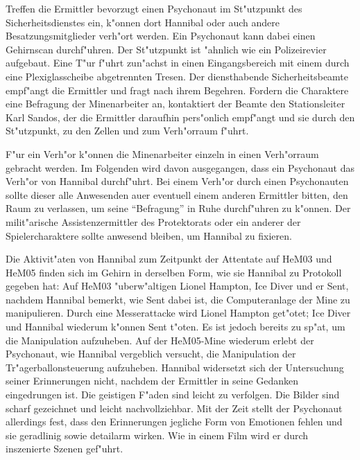 
Treffen die Ermittler bevorzugt einen Psychonaut im St"utzpunkt des Sicherheitsdienstes ein, k"onnen dort Hannibal oder auch andere Besatzungsmitglieder verh"ort werden. Ein Psychonaut kann dabei einen Gehirnscan durchf"uhren. Der St"utzpunkt ist "ahnlich wie ein Polizeirevier aufgebaut. Eine T"ur f"uhrt zun"achst in einen Eingangsbereich mit einem durch eine Plexiglasscheibe abgetrennten Tresen. Der diensthabende Sicherheitsbeamte empf"angt die Ermittler und fragt nach ihrem Begehren. Fordern die Charaktere eine Befragung der Minenarbeiter an, kontaktiert der Beamte den Stationsleiter Karl Sandos, der die Ermittler daraufhin pers"onlich empf"angt und sie durch den St"utzpunkt, zu den Zellen und zum Verh"orraum f"uhrt.

F"ur ein Verh"or k"onnen die Minenarbeiter einzeln in einen Verh"orraum gebracht werden. Im Folgenden wird davon ausgegangen, dass ein Psychonaut das Verh"or von Hannibal durchf"uhrt. Bei einem Verh"or durch einen Psychonauten sollte dieser alle Anwesenden au\3er eventuell einem anderen Ermittler bitten, den Raum zu verlassen, um seine ``Befragung'' in Ruhe durchf"uhren zu k"onnen. Der milit"arische Assistenzermittler des Protektorats oder ein anderer der Spielercharaktere sollte anwesend bleiben, um Hannibal zu fixieren.

Die Aktivit"aten von Hannibal zum Zeitpunkt der Attentate auf HeM03 und HeM05 finden sich im Gehirn in derselben Form, wie sie Hannibal zu Protokoll gegeben hat: Auf HeM03 "uberw"altigen Lionel Hampton, Ice Diver und er Sent, nachdem Hannibal bemerkt, wie Sent dabei ist, die Computeranlage der Mine zu manipulieren. Durch eine Messerattacke wird Lionel Hampton get"otet; Ice Diver und Hannibal wiederum k"onnen Sent t"oten. Es ist jedoch bereits zu sp"at, um die Manipulation aufzuheben. Auf der HeM05-Mine wiederum erlebt der Psychonaut, wie Hannibal vergeblich versucht, die Manipulation der Tr"agerballonsteuerung aufzuheben. Hannibal widersetzt sich der Untersuchung seiner Erinnerungen nicht, nachdem der Ermittler in seine Gedanken eingedrungen ist. Die geistigen F"aden sind leicht zu verfolgen. Die Bilder sind scharf gezeichnet und leicht nachvollziehbar. Mit der Zeit stellt der Psychonaut allerdings fest, dass den Erinnerungen jegliche Form von Emotionen fehlen und sie geradlinig sowie detailarm wirken. Wie in einem Film wird er durch inszenierte Szenen gef"uhrt.

